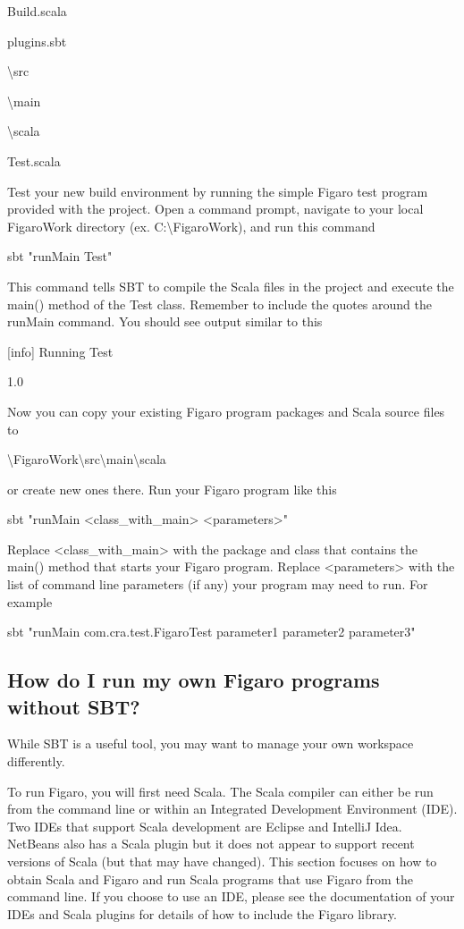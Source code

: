 \documentclass[]{article}
\begin{document}
Build.scala

plugins.sbt

\textbackslash{}src

\textbackslash{}main

\textbackslash{}scala

Test.scala

Test your new build environment by running the simple Figaro test
program provided with the project. Open a command prompt, navigate to
your local FigaroWork directory (ex. C:\textbackslash{}FigaroWork), and
run this command

sbt "runMain Test"

This command tells SBT to compile the Scala files in the project and
execute the main() method of the Test class. Remember to include the
quotes around the runMain command. You should see output similar to this

{[}info{]} Running Test

1.0

Now you can copy your existing Figaro program packages and Scala source
files to

\textbackslash{}FigaroWork\textbackslash{}src\textbackslash{}main\textbackslash{}scala

or create new ones there. Run your Figaro program like this

sbt "runMain \textless{}class\_with\_main\textgreater{}
\textless{}parameters\textgreater{}"

Replace \textless{}class\_with\_main\textgreater{} with the package and
class that contains the main() method that starts your Figaro program.
Replace \textless{}parameters\textgreater{} with the list of command
line parameters (if any) your program may need to run. For example

sbt "runMain com.cra.test.FigaroTest parameter1 parameter2 parameter3"

\subsection{How do I run my own Figaro programs without
SBT?}\label{how-do-i-run-my-own-figaro-programs-without-sbt}

While SBT is a useful tool, you may want to manage your own workspace
differently.

To run Figaro, you will first need Scala. The Scala compiler can either
be run from the command line or within an Integrated Development
Environment (IDE). Two IDEs that support Scala development are Eclipse
and IntelliJ Idea. NetBeans also has a Scala plugin but it does not
appear to support recent versions of Scala (but that may have changed).
This section focuses on how to obtain Scala and Figaro and run Scala
programs that use Figaro from the command line. If you choose to use an
IDE, please see the documentation of your IDEs and Scala plugins for
details of how to include the Figaro library.
\end{document}
